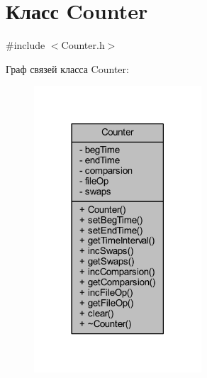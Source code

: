 \hypertarget{class_counter}{}\section{Класс Counter}
\label{class_counter}


{\ttfamily \#include $<$Counter.\+h$>$}



Граф связей класса Counter\+:\nopagebreak
\begin{figure}[H]
\begin{center}
\leavevmode
\includegraphics[width=177pt]{class_counter__coll__graph}
\end{center}
\end{figure}
